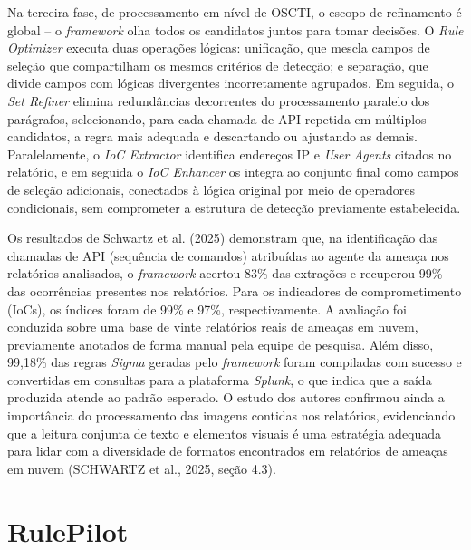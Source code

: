 Na terceira fase, de processamento em nível de OSCTI, o escopo de refinamento é global -- o \textit{framework} olha todos os candidatos juntos para tomar decisões.
O \textit{Rule Optimizer} executa duas operações lógicas:
unificação, que mescla campos de seleção que compartilham os mesmos critérios de detecção; 
e separação, que divide campos com lógicas divergentes incorretamente agrupados. 
Em seguida, o \textit{Set Refiner} elimina redundâncias decorrentes do processamento paralelo dos parágrafos,
selecionando, para cada chamada de API repetida em múltiplos candidatos, a regra mais adequada e descartando ou ajustando as demais. 
Paralelamente, o \textit{IoC Extractor} identifica endereços IP e \textit{User Agents} citados no relatório, 
e em seguida o \textit{IoC Enhancer} os integra ao conjunto final como campos de seleção adicionais, 
conectados à lógica original por meio de operadores condicionais, sem comprometer a estrutura de detecção previamente estabelecida.

Os resultados de Schwartz et al. (2025) demonstram que, na identificação das chamadas de API (sequência de comandos) atribuídas ao agente da ameaça nos relatórios analisados, 
o \textit{framework} acertou 83\% das extrações e recuperou 99\% das ocorrências presentes nos relatórios. 
Para os indicadores de comprometimento (IoCs), os índices foram de 99\% e 97\%, respectivamente. 
A avaliação foi conduzida sobre uma base de vinte relatórios reais de ameaças em nuvem, previamente anotados de forma manual pela equipe de pesquisa. 
Além disso, 99,18\% das regras \textit{Sigma} geradas pelo \textit{framework} foram compiladas com sucesso e convertidas em consultas para a plataforma \textit{Splunk}, 
o que indica que a saída produzida atende ao padrão esperado. 
O estudo dos autores confirmou ainda a importância do processamento das imagens contidas nos relatórios,
evidenciando que a leitura conjunta de texto e elementos visuais é uma estratégia adequada para lidar com a diversidade de formatos encontrados em relatórios de ameaças em nuvem (SCHWARTZ et al., 2025, seção 4.3).

\cite[p. 1830]{schwartz2025}

\section{RulePilot}

